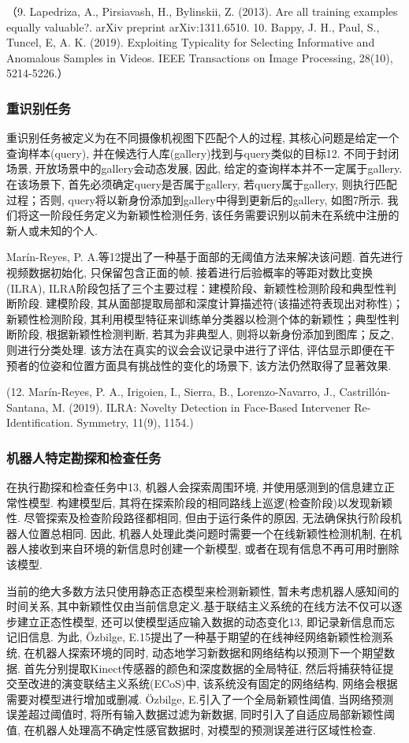 \documentclass{Style/aas}
\begin{document}
\begin{multicols}{2}
  （9.	Lapedriza, A., Pirsiavash, H., Bylinskii, Z. (2013). Are all training examples equally valuable?. arXiv preprint arXiv:1311.6510.
  10.	Bappy, J. H., Paul, S., Tuncel, E, A. K. (2019). Exploiting Typicality for Selecting Informative and Anomalous Samples in Videos. IEEE Transactions on Image Processing, 28(10), 5214-5226.）

  \subsubsection{重识别任务}
  重识别任务被定义为在不同摄像机视图下匹配个人的过程, 其核心问题是给定一个查询样本(query), 并在候选行人库(gallery)找到与query类似的目标12. 不同于封闭场景, 开放场景中的gallery会动态发展, 因此, 给定的查询样本并不一定属于gallery. 在该场景下, 首先必须确定query是否属于gallery, 若query属于gallery, 则执行匹配过程；否则, query将以新身份添加到gallery中得到更新后的gallery, 如图7所示. 我们将这一阶段任务定义为新颖性检测任务, 该任务需要识别以前未在系统中注册的新人或未知的个人.

  Marín-Reyes, P. A.等12提出了一种基于面部的无阈值方法来解决该问题. 首先进行视频数据初始化, 只保留包含正面的帧. 接着进行后验概率的等距对数比变换(ILRA), ILRA阶段包括了三个主要过程：建模阶段、新颖性检测阶段和典型性判断阶段. 建模阶段, 其从面部提取局部和深度计算描述符(该描述符表现出对称性)；新颖性检测阶段, 其利用模型特征来训练单分类器以检测个体的新颖性；典型性判断阶段, 根据新颖性检测判断, 若其为非典型人, 则将以新身份添加到图库；反之, 则进行分类处理. 该方法在真实的议会会议记录中进行了评估, 评估显示即便在干预者的位姿和位置方面具有挑战性的变化的场景下, 该方法仍然取得了显著效果.

  (12.	Marín-Reyes, P. A., Irigoien, I., Sierra, B., Lorenzo-Navarro, J., Castrillón-Santana, M. (2019). ILRA: Novelty Detection in Face-Based Intervener Re-Identification. Symmetry, 11(9), 1154.)

  \subsubsection{机器人特定勘探和检查任务}
  在执行勘探和检查任务中13, 机器人会探索周围环境, 并使用感测到的信息建立正常性模型. 构建模型后, 其将在探索阶段的相同路线上巡逻(检查阶段)以发现新颖性. 尽管探索及检查阶段路径都相同, 但由于运行条件的原因, 无法确保执行阶段机器人位置总相同. 因此, 机器人处理此类问题时需要一个在线新颖性检测机制, 在机器人接收到来自环境的新信息时创建一个新模型, 或者在现有信息不再可用时删除该模型.

  当前的绝大多数方法只使用静态正态模型来检测新颖性, 暂未考虑机器人感知间的时间关系, 其中新颖性仅由当前信息定义.基于联结主义系统的在线方法不仅可以逐步建立正态性模型, 还可以使模型适应输入数据的动态变化13, 即记录新信息而忘记旧信息. 为此, Özbilge, E.15提出了一种基于期望的在线神经网络新颖性检测系统, 在机器人探索环境的同时, 动态地学习新数据和网络结构以预测下一个期望数据. 首先分别提取Kinect传感器的颜色和深度数据的全局特征, 然后将捕获特征提交至改进的演变联结主义系统(ECoS)中, 该系统没有固定的网络结构, 网络会根据需要对模型进行增加或删减. Özbilge, E.引入了一个全局新颖性阈值, 当网络预测误差超过阈值时, 将所有输入数据过滤为新数据, 同时引入了自适应局部新颖性阈值, 在机器人处理高不确定性感官数据时, 对模型的预测误差进行区域性检查.


\end{multicols}
\end{document}
